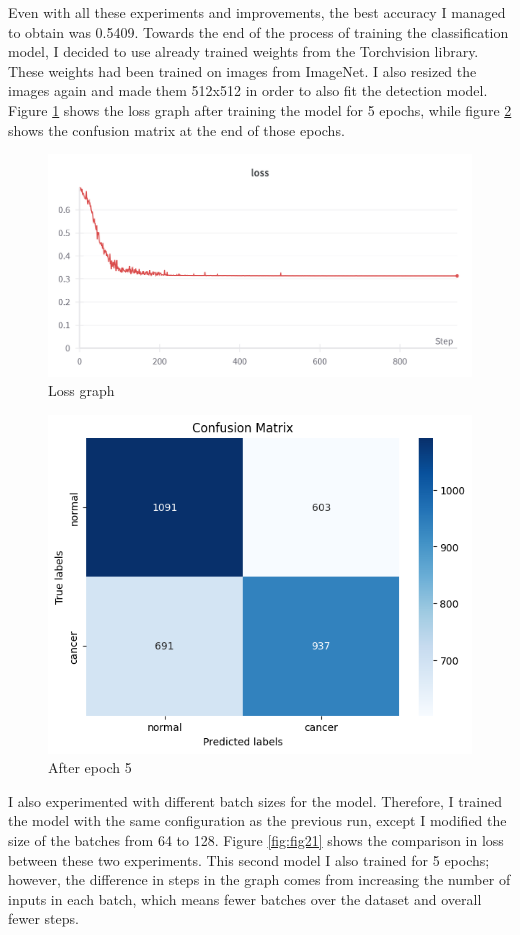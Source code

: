 Even with all these experiments and improvements, the best accuracy I managed to obtain was 0.5409. Towards the end of the process of training the classification model, I decided to use already trained weights from the Torchvision library. These weights had been trained on images from ImageNet. I also resized the images again and made them 512x512 in order to also fit the detection model. Figure \ref{fig:fig19} shows the loss graph after training the model for 5 epochs, while figure \ref{fig:fig20} shows the confusion matrix at the end of those epochs.\\
\begin{figure}[!ht]
    \centering
    \includegraphics[width=1\linewidth]{figures/Figure20.png}
    \caption{Loss graph}
    \label{fig:fig19}
\end{figure}
\begin{figure}[!ht]
    \centering
    \includegraphics[width=0.5\linewidth]{figures/Figure21.png}
    \caption{After epoch 5}
    \label{fig:fig20}
\end{figure}
I also experimented with different batch sizes for the model. Therefore, I trained the model with the same configuration as the previous run, except I modified the size of the batches from 64 to 128. Figure \ref{fig:fig21} shows the comparison in loss between these two experiments. This second model I also trained for 5 epochs; however, the difference in steps in the graph comes from increasing the number of inputs in each batch, which means fewer batches over the dataset and overall fewer steps.\\
